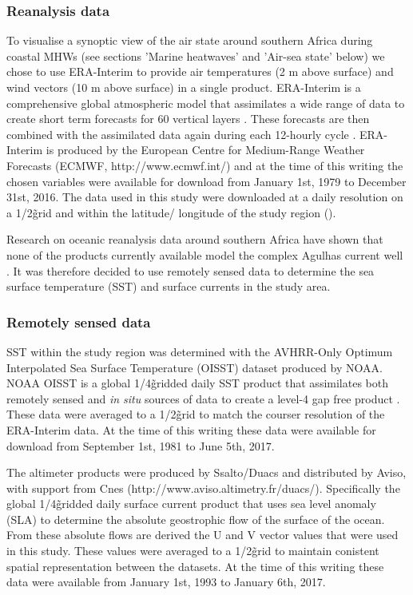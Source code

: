 \documentclass[a4paper,10pt,review]{elsarticle}
\begin{document}
\subsubsection{Reanalysis data}
To visualise a synoptic view of the air state around southern Africa during coastal MHWs (see sections 'Marine heatwaves' and 'Air-sea state' below) we chose to use ERA-Interim to provide air temperatures (2 m above surface) and wind vectors (10 m above surface) in a single product. ERA-Interim is a comprehensive global atmospheric model that assimilates a wide range of data to create short term forecasts for 60 vertical layers \citep{Dee2011}. These forecasts are then combined with the assimilated data again during each 12-hourly cycle \citep{Dee2011}. ERA-Interim is produced by the European Centre for Medium-Range Weather Forecasts (ECMWF, http://www.ecmwf.int/) and at the time of this writing the chosen variables were available for download from January 1st, 1979 to December 31st, 2016. The data used in this study were downloaded at a daily resolution on a 1/2\degree\~ grid and within the latitude/ longitude of the study region ().

Research on oceanic reanalysis data around southern Africa have shown that none of the products currently available model the complex Agulhas current well \citep{Cooper2014}. It was therefore decided to use remotely sensed data to determine the sea surface temperature (SST) and surface currents in the study area.

\subsubsection{Remotely sensed data}
SST within the study region was determined with the AVHRR-Only Optimum Interpolated Sea Surface Temperature (OISST) dataset produced by NOAA. NOAA OISST is a global 1/4\degree\~ gridded daily SST product that assimilates both remotely sensed and \emph{in situ} sources of data to create a level-4 gap free product \citep{Banzon2016}. These data were averaged to a 1/2\degree\~ grid to match the courser resolution of the ERA-Interim data. At the time of this writing these data were available for download from September 1st, 1981 to June 5th, 2017.

The altimeter products were produced by Ssalto/Duacs and distributed by Aviso, with support from Cnes (http://www.aviso.altimetry.fr/duacs/). Specifically the global 1/4\degree\~ gridded daily surface current product that uses sea level anomaly (SLA) to determine the absolute geostrophic flow of the surface of the ocean. From these absolute flows are derived the U and V vector values that were used in this study. These values were averaged to a 1/2\degree\~ grid to maintain conistent spatial representation between the datasets. At the time of this writing these data were available from January 1st, 1993 to January 6th, 2017.
\end{document}
